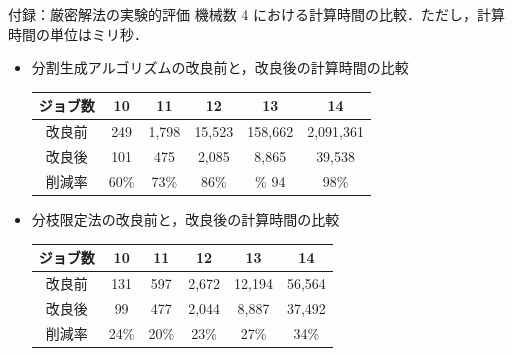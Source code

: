 \documentclass[dvipdfmx]{beamer}
\begin{document}
    \begin{frame}{付録：厳密解法の実験的評価}
      機械数 4 における計算時間の比較．ただし，計算時間の単位はミリ秒．
      \begin{itemize}
        \item 分割生成アルゴリズムの改良前と，改良後の計算時間の比較
        \begin{tabular}{|c|c|c|c|c|c|} \hline
          ジョブ数 & 10 & 11 & 12 & 13 & 14 \\ \hline \hline
          改良前 & 249 & 1,798 & 15,523 & 158,662 & 2,091,361\\ \hline
          改良後 & 101 & 475 & 2,085 & 8,865 & 39,538\\ \hline
          削減率 & 60\% & 73\% & 86\% & \% 94& \alert{98\%} \\ \hline
        \end{tabular}
        \item 分枝限定法の改良前と，改良後の計算時間の比較
        \begin{tabular}{|c|c|c|c|c|c|} \hline
          ジョブ数 & 10 & 11 & 12 & 13 & 14\\ \hline \hline
          改良前 & 131 & 597 & 2,672 & 12,194 & 56,564 \\ \hline
          改良後 & 99 & 477 & 2,044 & 8,887 & 37,492 \\ \hline
          削減率 & 24\% & 20\% & 23\% & 27\% & \alert{34\%} \\ \hline
        \end{tabular}
      \end{itemize}
    \end{frame}
    
\end{document}
